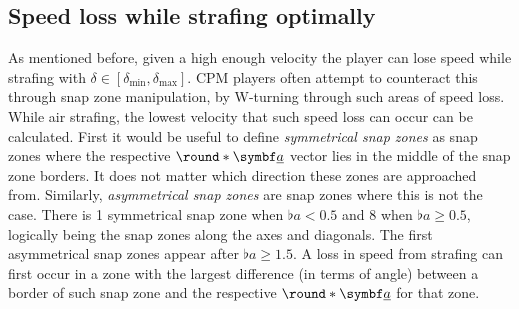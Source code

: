 \subsection{Speed loss while strafing optimally}
\label{sec:speed_loss_while_strafing}
As mentioned before, given a high enough velocity the player can lose speed while strafing with $\delta \in [\delta_{\min}, \delta_{\max}]$. CPM players often attempt to counteract this through snap zone manipulation, by W-turning through such areas of speed loss.\\

While air strafing, the lowest velocity that such speed loss can occur can be calculated. First it would be useful to define \emph{symmetrical snap zones} as snap zones where the respective $\round*{\vec{\flat{a}}}$ vector lies in the middle of the snap zone borders. It does not matter which direction these zones are approached from. Similarly, \emph{asymmetrical snap zones} are snap zones where this is not the case.
There is 1 symmetrical snap zone when $\flat{a} < 0.5$ and 8 when $\flat{a}\ge 0.5$, logically being the snap zones along the axes and diagonals. The first asymmetrical snap zones appear after $\flat{a}\ge 1.5$.
A loss in speed from strafing can first occur in a zone with the largest difference (in terms of angle) between a border of such snap zone and the respective $\round*{\vec{\flat{a}}}$ for that zone.\\

